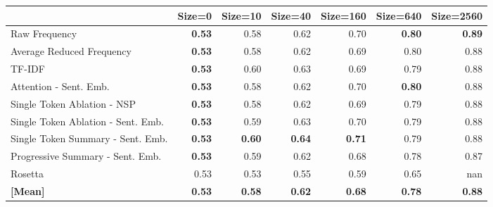 \begin{tabular}{lrrrrrr}
\toprule
 & Size=0 & Size=10 & Size=40 & Size=160 & Size=640 & Size=2560 \\
\midrule
Raw Frequency & \cellcolor[RGB]{63,83,198}\textbf{0.53} & \cellcolor[RGB]{105,139,239}0.58 & \cellcolor[RGB]{142,177,253}0.62 & \cellcolor[RGB]{214,219,228}0.70 & \cellcolor[RGB]{243,152,121}\textbf{0.80} & \cellcolor[RGB]{179,3,38}\textbf{0.89} \\
Average Reduced Frequency & \cellcolor[RGB]{63,83,198}\textbf{0.53} & \cellcolor[RGB]{105,139,239}0.58 & \cellcolor[RGB]{141,175,253}0.62 & \cellcolor[RGB]{211,219,230}0.69 & \cellcolor[RGB]{244,154,123}0.80 & \cellcolor[RGB]{181,8,39}0.88 \\
TF-IDF & \cellcolor[RGB]{63,83,198}\textbf{0.53} & \cellcolor[RGB]{123,158,248}0.60 & \cellcolor[RGB]{156,188,254}0.63 & \cellcolor[RGB]{213,219,229}0.69 & \cellcolor[RGB]{244,155,124}0.79 & \cellcolor[RGB]{184,17,41}0.88 \\
Attention - Sent. Emb. & \cellcolor[RGB]{63,83,198}\textbf{0.53} & \cellcolor[RGB]{105,139,239}0.58 & \cellcolor[RGB]{146,180,254}0.62 & \cellcolor[RGB]{214,219,228}0.70 & \cellcolor[RGB]{243,152,121}\textbf{0.80} & \cellcolor[RGB]{181,8,39}0.88 \\
Single Token Ablation - NSP & \cellcolor[RGB]{63,83,198}\textbf{0.53} & \cellcolor[RGB]{105,139,239}0.58 & \cellcolor[RGB]{142,177,253}0.62 & \cellcolor[RGB]{211,219,230}0.69 & \cellcolor[RGB]{244,155,124}0.79 & \cellcolor[RGB]{181,8,39}0.88 \\
Single Token Ablation - Sent. Emb. & \cellcolor[RGB]{63,83,198}\textbf{0.53} & \cellcolor[RGB]{116,151,245}0.59 & \cellcolor[RGB]{152,185,254}0.63 & \cellcolor[RGB]{217,220,224}0.70 & \cellcolor[RGB]{244,155,124}0.79 & \cellcolor[RGB]{182,13,40}0.88 \\
Single Token Summary - Sent. Emb. & \cellcolor[RGB]{63,83,198}\textbf{0.53} & \cellcolor[RGB]{126,161,249}\textbf{0.60} & \cellcolor[RGB]{163,193,254}\textbf{0.64} & \cellcolor[RGB]{222,219,218}\textbf{0.71} & \cellcolor[RGB]{244,157,126}0.79 & \cellcolor[RGB]{190,35,45}0.88 \\
Progressive Summary - Sent. Emb. & \cellcolor[RGB]{63,83,198}\textbf{0.53} & \cellcolor[RGB]{116,151,245}0.59 & \cellcolor[RGB]{145,179,254}0.62 & \cellcolor[RGB]{202,216,238}0.68 & \cellcolor[RGB]{246,170,140}0.78 & \cellcolor[RGB]{191,40,46}0.87 \\
Rosetta & \cellcolor[RGB]{58,76,192}0.53 & \cellcolor[RGB]{62,81,196}0.53 & \cellcolor[RGB]{78,105,216}0.55 & \cellcolor[RGB]{112,147,243}0.59 & \cellcolor[RGB]{178,203,251}0.65 & \cellcolor[RGB]{0,0,0}nan \\
\midrule 
\textbf{[Mean]} & \textbf{0.53} & \textbf{0.58} & \textbf{0.62} & \textbf{0.68} & \textbf{0.78} & \textbf{0.88} \\
\bottomrule
\end{tabular}